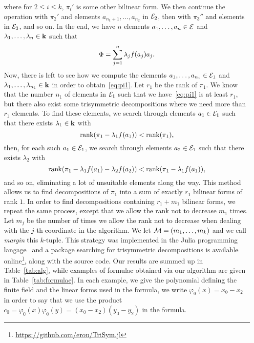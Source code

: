 \documentclass[11pt]{article}
\begin{document}
where for $2\leq i \leq k$, $\pi_i'$ is some other bilinear form.
We then continue the operation with $\pi_2'$ and elements $a_{n_1+1}, \dots,
a_{n_2}$ in $\mathcal{E}_2$, then with $\pi_3''$ and elements in $\mathcal{E}_3$, and so on. In
the end, we have $n$ elements $a_1, \dots, a_n\in \mathcal{E}$ and $\lambda_1, \dots,
\lambda_n\in\mathbf{k}$ such that
\[
  \Phi = \sum_{j=1}^{n}\lambda_jf(a_j)a_j.
\]
Now, there is left to see how we compute the elements $a_1, \dots,
a_{n_1}\in\mathcal{E}_1$ and $\lambda_1, \dots, \lambda_{n_1}\in\mathbf{k}$ in order to
obtain~\eqref{eq:pi1}. Let $r_1$ be the rank of $\pi_1$. We know that the number
$n_1$ of elements in $\mathcal{E}_1$ such that we have~\eqref{eq:pi1} is at least $r_1$,
but there also exist some trisymmetric decompositions where we need more than $r_1$
elements. To find these elements, we search through elements $a_1\in\mathcal{E}_1$ such that
there exists $\lambda_1\in\mathbf{k}$ with
\[
  \operatorname{rank}(\pi_1-\lambda_1f(a_1))<\operatorname{rank}(\pi_1),
\]
then, for each such $a_1\in\mathcal{E}_1$, we search through elements $a_2\in\mathcal{E}_1$ such that there exists $\lambda_2$
with
\[
  \operatorname{rank}(\pi_1-\lambda_1f(a_1)-\lambda_2f(a_2))<\operatorname{rank}(\pi_1-\lambda_1f(a_1)),
\]
and so on, eliminating a lot of unsuitable elements along the way. This method
allows us to find decompositions of $\pi_1$ into a sum of exactly $r_1$ bilinear forms of
rank $1$. In order to find decompositions containing $r_1+m_1$ bilinear forms, we
repeat the same process, except that we allow the rank not to decrease $m_1$
times. Let $m_j$ be the number of times we allow the rank not to decrease
when dealing with the $j$-th coordinate in the algorithm. We let $\mathcal{M}=(m_1,
\dots, m_k)$ and we call \emph{margin} this $k$-tuple. This strategy was
implemented in the Julia programming
langage~\cite{Julia} and a package searching for trisymmetric decompositions is
available online\footnote{\url{https://github.com/erou/TriSym.jl}}, along with
the source code. Our results are summed up in Table~\ref{tab:alg}, while
examples of formulae obtained via our algorithm are given in
Table~\ref{tab:formulae}. In each example, we give the polynomial defining the
finite field and the linear forms used in the formula, \eg we write
$\varphi_0(x)=x_0-x_2$ in order to say that we use the product
$c_0=\varphi_0(x)\varphi_0(y)=(x_0-x_2)(y_0-y_2)$ in the formula.
\end{document}
